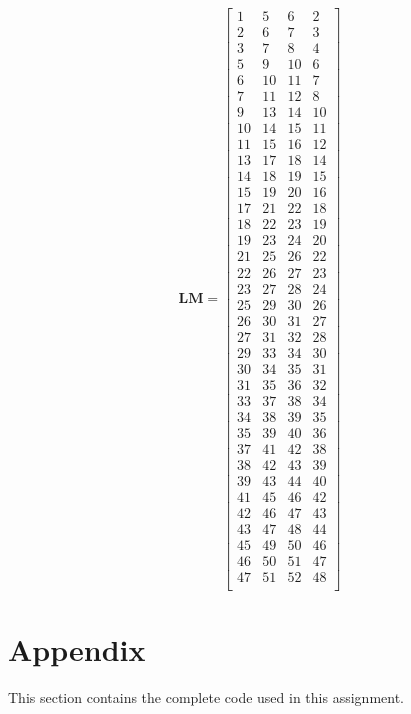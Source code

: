 \documentclass[10pt]{article}
\begin{document}
\begin{equation}
\textbf{LM}=
\begin{bmatrix}
1 & 5 & 6 & 2 \\
2 & 6 & 7 & 3 \\
3 & 7 & 8 & 4 \\
5 & 9 & 10 & 6 \\
6 & 10 & 11 & 7 \\
7 & 11 & 12 & 8 \\
9 & 13 & 14 & 10 \\
10 & 14 & 15 & 11 \\
11 & 15 & 16 & 12 \\
13 & 17 & 18 & 14 \\
14 & 18 & 19 & 15 \\
15 & 19 & 20 & 16 \\
17 & 21 & 22 & 18 \\
18 & 22 & 23 & 19 \\
19 & 23 & 24 & 20 \\
21 & 25 & 26 & 22 \\
22 & 26 & 27 & 23 \\
23 & 27 & 28 & 24 \\
25 & 29 & 30 & 26 \\
26 & 30 & 31 & 27 \\
27 & 31 & 32 & 28 \\
29 & 33 & 34 & 30 \\
30 & 34 & 35 & 31 \\
31 & 35 & 36 & 32 \\
33 & 37 & 38 & 34 \\
34 & 38 & 39 & 35 \\
35 & 39 & 40 & 36 \\
37 & 41 & 42 & 38 \\
38 & 42 & 43 & 39 \\
39 & 43 & 44 & 40 \\
41 & 45 & 46 & 42 \\
42 & 46 & 47 & 43 \\
43 & 47 & 48 & 44 \\
45 & 49 & 50 & 46 \\
46 & 50 & 51 & 47 \\
47 & 51 & 52 & 48 \\
\end{bmatrix}
\end{equation}

\section{Appendix}

This section contains the complete code used in this assignment. 

\end{document}
